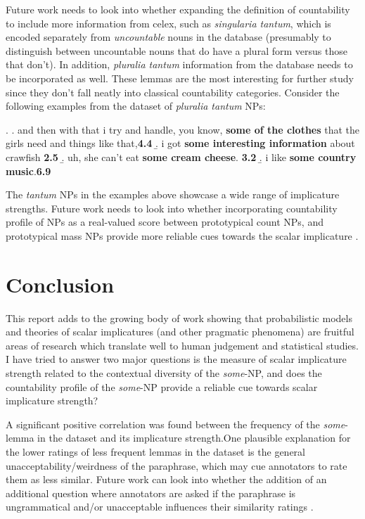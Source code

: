 \documentclass[10pt, biblatex, linguex]{report}
\begin{document}
Future work needs to look into whether expanding the definition of countability
to include more information from {\rmsc celex}, such as \textit{singularia
tantum}, which is encoded separately from \textit{uncountable} nouns in the
database (presumably to distinguish between uncountable nouns that do have a
plural form versus those that don't). In addition, \textit{pluralia tantum}
information from the database needs to be incorporated as well. These lemmas
are the most interesting for further study since they don't fall neatly into
classical countability categories. Consider the
following examples from the dataset of \textit{pluralia tantum} NPs:

\ex. \a. and then with that i try and handle, you know, \textbf{some of the
         clothes} that the girls need and things like that,\hfill \textbf{4.4}
     \b. i got \textbf{some interesting information} about crawfish \hfill \textbf{2.5}
     \b. uh, she can't eat \textbf{some cream cheese}. \hfill \textbf{3.2}
     \b. i like \textbf{some country music}.\hfill \textbf{6.9}

The \textit{tantum} NPs in the examples above showcase a wide range of implicature
strengths. Future work needs to look into whether incorporating countability
profile of NPs as a real-valued score between prototypical count NPs, and
prototypical mass NPs provide more reliable cues towards the scalar implicature
\citep{grimmgrammatical2018}.

\section{Conclusion}
\label{sec:conclusion}

This report adds to the growing body of work showing that probabilistic models
and theories of scalar implicatures (and other pragmatic phenomena) are fruitful
areas of research which translate well to human judgement and statistical
studies. I have tried to answer two major questions \dash is the measure
of scalar implicature strength related to the contextual diversity of the
\textit{some}-NP, and does the countability profile of the \textit{some}-NP
provide a reliable cue towards scalar implicature strength?

A significant positive correlation was found between the frequency of the
\textit{some}-lemma in the dataset and its implicature strength.One plausible
explanation for the lower ratings of less frequent lemmas in the
dataset is the general unacceptability/weirdness of the paraphrase, which may
cue annotators to rate them as less similar. Future work can look into whether
the addition of an additional question where annotators are asked if the
paraphrase is ungrammatical and/or unacceptable influences their similarity
ratings \citep{white_computational_2016}.
\end{document}
